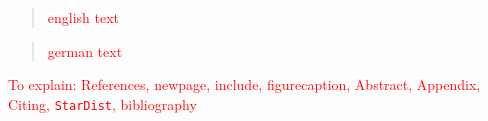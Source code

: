 \begin{abstract}
	\textcolor{red}{english text}
	\lipsum[1]
\end{abstract}
\begin{abstract}
	\textcolor{red}{german text}
	\lipsum[2]
\end{abstract}
\textcolor{red}{To explain:
References, newpage, include, figurecaption, Abstract, Appendix, Citing, \texttt{StarDist}, bibliography
}